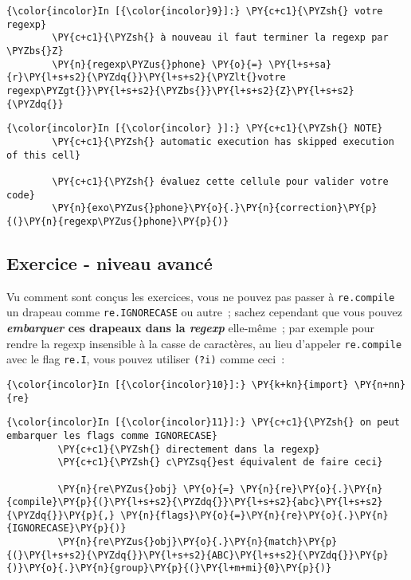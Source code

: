     \begin{Verbatim}[commandchars=\\\{\}]
{\color{incolor}In [{\color{incolor}9}]:} \PY{c+c1}{\PYZsh{} votre regexp}
        \PY{c+c1}{\PYZsh{} à nouveau il faut terminer la regexp par \PYZbs{}Z}
        \PY{n}{regexp\PYZus{}phone} \PY{o}{=} \PY{l+s+sa}{r}\PY{l+s+s2}{\PYZdq{}}\PY{l+s+s2}{\PYZlt{}votre regexp\PYZgt{}}\PY{l+s+s2}{\PYZbs{}}\PY{l+s+s2}{Z}\PY{l+s+s2}{\PYZdq{}}
\end{Verbatim}


    \begin{Verbatim}[commandchars=\\\{\}]
{\color{incolor}In [{\color{incolor} }]:} \PY{c+c1}{\PYZsh{} NOTE}
        \PY{c+c1}{\PYZsh{} automatic execution has skipped execution of this cell}
        
        \PY{c+c1}{\PYZsh{} évaluez cette cellule pour valider votre code}
        \PY{n}{exo\PYZus{}phone}\PY{o}{.}\PY{n}{correction}\PY{p}{(}\PY{n}{regexp\PYZus{}phone}\PY{p}{)}
\end{Verbatim}


    \hypertarget{exercice---niveau-avancuxe9}{%
\subsection{Exercice - niveau
avancé}\label{exercice---niveau-avancuxe9}}

    Vu comment sont conçus les exercices, vous ne pouvez pas passer à
\texttt{re.compile} un drapeau comme \texttt{re.IGNORECASE} ou autre~;
sachez cependant que vous pouvez \textbf{\emph{embarquer} ces drapeaux
dans la \emph{regexp}} elle-même~; par exemple pour rendre la regexp
insensible à la casse de caractères, au lieu d'appeler
\texttt{re.compile} avec le flag \texttt{re.I}, vous pouvez utiliser
\texttt{(?i)} comme ceci~:

    \begin{Verbatim}[commandchars=\\\{\}]
{\color{incolor}In [{\color{incolor}10}]:} \PY{k+kn}{import} \PY{n+nn}{re}
\end{Verbatim}


    \begin{Verbatim}[commandchars=\\\{\}]
{\color{incolor}In [{\color{incolor}11}]:} \PY{c+c1}{\PYZsh{} on peut embarquer les flags comme IGNORECASE}
         \PY{c+c1}{\PYZsh{} directement dans la regexp}
         \PY{c+c1}{\PYZsh{} c\PYZsq{}est équivalent de faire ceci}
         
         \PY{n}{re\PYZus{}obj} \PY{o}{=} \PY{n}{re}\PY{o}{.}\PY{n}{compile}\PY{p}{(}\PY{l+s+s2}{\PYZdq{}}\PY{l+s+s2}{abc}\PY{l+s+s2}{\PYZdq{}}\PY{p}{,} \PY{n}{flags}\PY{o}{=}\PY{n}{re}\PY{o}{.}\PY{n}{IGNORECASE}\PY{p}{)}
         \PY{n}{re\PYZus{}obj}\PY{o}{.}\PY{n}{match}\PY{p}{(}\PY{l+s+s2}{\PYZdq{}}\PY{l+s+s2}{ABC}\PY{l+s+s2}{\PYZdq{}}\PY{p}{)}\PY{o}{.}\PY{n}{group}\PY{p}{(}\PY{l+m+mi}{0}\PY{p}{)}
\end{Verbatim}


